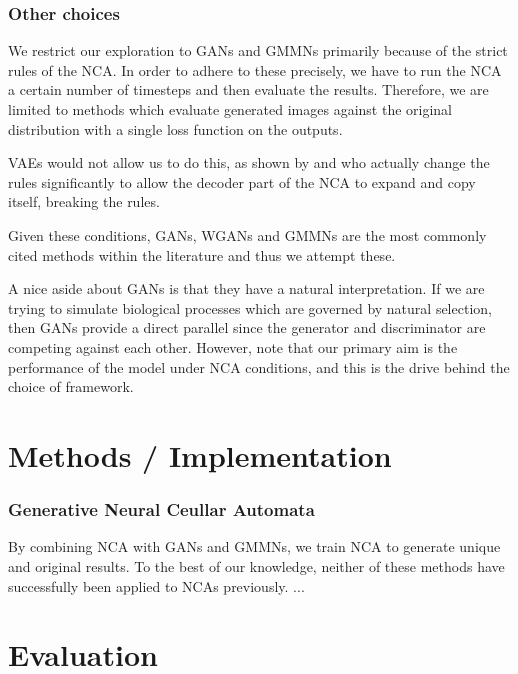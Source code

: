 \documentclass[12pt]{report}
\begin{document}
\subsection{Other choices}

We restrict our exploration to GANs and GMMNs primarily because of the strict rules of the NCA. In order to adhere to these precisely, we have to run the NCA a certain number of timesteps and then evaluate the results. Therefore, we are limited to methods which evaluate generated images against the original distribution with a single loss function on the outputs. 

VAEs would not allow us to do this, as shown by \cite{palm2022variational} and \cite{kalkhof2024frequencytime} who actually change the rules significantly to allow the decoder part of the NCA to expand and copy itself, breaking the rules. 

Given these conditions, GANs, WGANs and GMMNs are the most commonly cited methods within the literature and thus we attempt these. 

A nice aside about GANs is that they have a natural interpretation. If we are trying to simulate biological processes which are governed by natural selection, then GANs provide a direct parallel since the generator and discriminator are competing against each other. However, note that our primary aim is the performance of the model under NCA conditions, and this is the drive behind the choice of framework.

\chapter{Methods / Implementation}

\subsection{Generative Neural Ceullar Automata}

By combining NCA with GANs and GMMNs, we train NCA to generate unique and original results. To the best of our knowledge, neither of these methods have  successfully been applied to NCAs previously. ...

\chapter{Evaluation}



\end{document}
